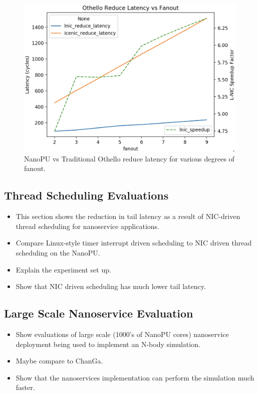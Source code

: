 \begin{figure}
  \includegraphics[width=\linewidth]{./figures/othello-reduce-latency}
  \caption{NanoPU vs Traditional Othello reduce latency for various degrees of fanout.}
  \label{fig:othello_reduce_latency}
\end{figure}

\subsection{Thread Scheduling Evaluations}
\begin{itemize}
    \item This section shows the reduction in tail latency as a result of NIC-driven thread scheduling for nanoservice applications.
    \item Compare Linux-style timer interrupt driven scheduling to NIC driven thread scheduling on the NanoPU.
    \item Explain the experiment set up.
    \item Show that NIC driven scheduling has much lower tail latency.
\end{itemize}

\subsection{Large Scale Nanoservice Evaluation}
\begin{itemize}
    \item Show evaluations of large scale (1000's of NanoPU cores) nanoservice deployment being used to implement an N-body simulation.
    \item Maybe compare to ChanGa.
    \item Show that the nanoservices implementation can perform the simulation much faster.
\end{itemize}